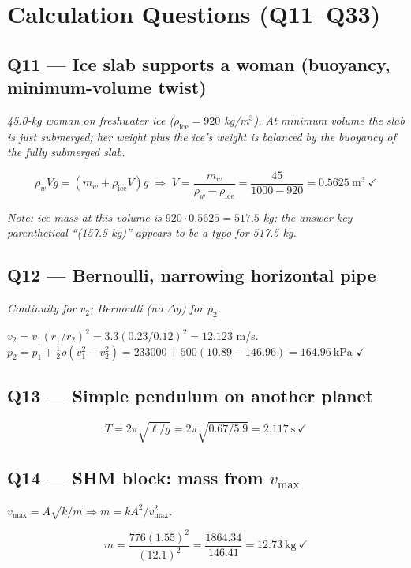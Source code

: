 \documentclass[11pt]{article}
\newcommand{\checkmk}{\ensuremath{\checkmark}}
\begin{document}
\section*{Calculation Questions (Q11--Q33)}

\subsection*{Q11 --- Ice slab supports a woman (buoyancy, minimum-volume twist)}
\emph{45.0-kg woman on freshwater ice (\(\rho_{\mathrm{ice}}=920\) kg/m\(^3\)). At minimum volume the slab is just submerged; her weight plus the ice's weight is balanced by the buoyancy of the fully submerged slab.}

\[\rho_w V g = (m_w + \rho_{\mathrm{ice}}V)g \;\Rightarrow\; V = \frac{m_w}{\rho_w-\rho_{\mathrm{ice}}} = \frac{45}{1000-920} = \boxed{0.5625\ \mathrm{m}^3}\ \checkmk\]

\noindent\emph{Note: ice mass at this volume is \(920\cdot 0.5625 = 517.5\) kg; the answer key parenthetical ``(157.5 kg)'' appears to be a typo for 517.5 kg.}

\subsection*{Q12 --- Bernoulli, narrowing horizontal pipe}
\emph{Continuity for \(v_2\); Bernoulli (no \(\Delta y\)) for \(p_2\).}

\(v_2 = v_1(r_1/r_2)^2 = 3.3(0.23/0.12)^2 = 12.123\) m/s.\\
\(p_2 = p_1 + \tfrac12\rho(v_1^2-v_2^2) = 233000 + 500(10.89-146.96) = \boxed{164.96\ \mathrm{kPa}}\) \checkmk

\subsection*{Q13 --- Simple pendulum on another planet}
\[T = 2\pi\sqrt{\ell/g} = 2\pi\sqrt{0.67/5.9} = \boxed{2.117\ \mathrm{s}}\ \checkmk\]

\subsection*{Q14 --- SHM block: mass from \(v_{\max}\)}
\emph{\(v_{\max} = A\sqrt{k/m} \Rightarrow m = kA^2/v_{\max}^2\).}

\[m = \frac{776(1.55)^2}{(12.1)^2} = \frac{1864.34}{146.41} = \boxed{12.73\ \mathrm{kg}}\ \checkmk\]
\end{document}
